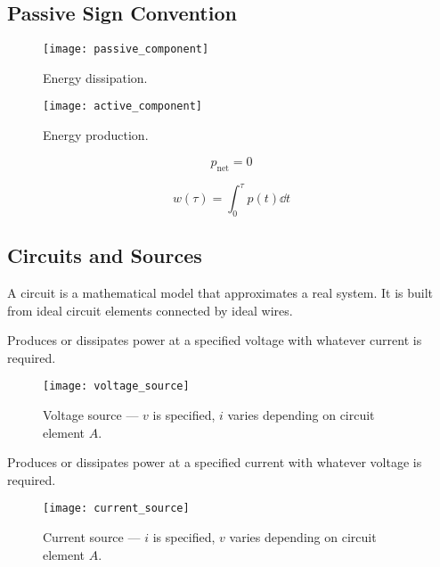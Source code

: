 \documentclass{article}
\begin{document}
\subsection{Passive Sign Convention}
\begin{figure}[H]
    \centering
    \begin{minipage}[H]{0.48\textwidth}
        \centering
        \texttt{[image: passive\_component]}
        \caption{Energy dissipation.}
    \end{minipage}\hfill
    \begin{minipage}[H]{0.48\textwidth}
        \centering
        \texttt{[image: active\_component]}
        \caption{Energy production.}
    \end{minipage}
\end{figure}
\begin{theorem}
    \begin{equation*}
        p_{\mathrm{net}} = 0
    \end{equation*}
\end{theorem}
\begin{theorem}[Energy]
    \begin{equation*}
        w\left( \tau \right) = \int_0^\tau p\left( t \right) \dd{t}
    \end{equation*}
\end{theorem}
\subsection{Circuits and Sources}
\begin{definition}[Circuits]
    A circuit is a mathematical model that approximates a real system. It is built from ideal circuit elements connected by ideal wires.
\end{definition}
\begin{definition}
    Produces or dissipates power at a specified voltage with whatever current is required.
\end{definition}
\begin{figure}[H]
    \centering
    \texttt{[image: voltage\_source]}
    \caption{Voltage source --- $v$ is specified, $i$ varies depending on circuit element $A$.}
\end{figure}
\begin{definition}
    Produces or dissipates power at a specified current with whatever voltage is required.
\end{definition}
\begin{figure}[H]
    \centering
    \texttt{[image: current\_source]}
    \caption{Current source --- $i$ is specified, $v$ varies depending on circuit element $A$.}
\end{figure}
\end{document}
